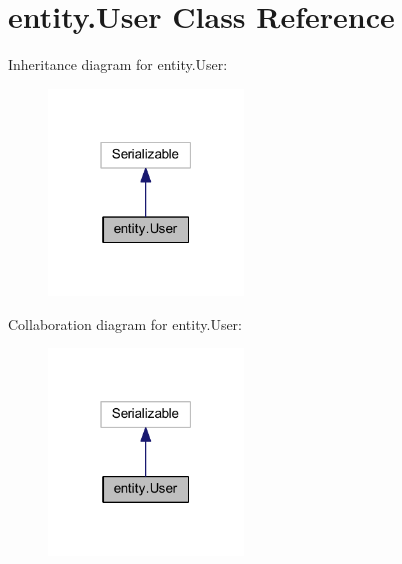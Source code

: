 \hypertarget{classentity_1_1_user}{}\section{entity.\+User Class Reference}
\label{classentity_1_1_user}


Inheritance diagram for entity.\+User\+:\nopagebreak
\begin{figure}[H]
\begin{center}
\leavevmode
\includegraphics[width=147pt]{classentity_1_1_user__inherit__graph}
\end{center}
\end{figure}


Collaboration diagram for entity.\+User\+:\nopagebreak
\begin{figure}[H]
\begin{center}
\leavevmode
\includegraphics[width=147pt]{classentity_1_1_user__coll__graph}
\end{center}
\end{figure}
